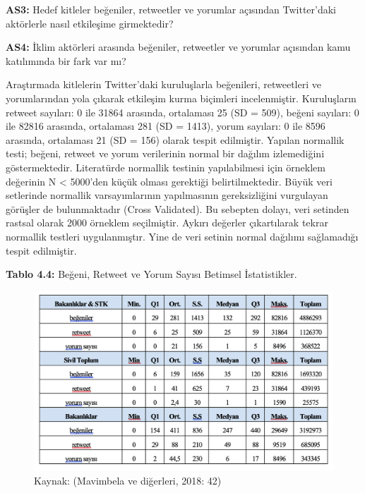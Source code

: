 \documentclass[
]{book}
\begin{document}
\textbf{AS3:} Hedef kitleler beğeniler, retweetler ve yorumlar açısından Twitter'daki aktörlerle nasıl etkileşime girmektedir?

\textbf{AS4:} İklim aktörleri arasında beğeniler, retweetler ve yorumlar açısından kamu katılımında bir fark var mı?

Araştırmada kitlelerin Twitter'daki kuruluşlarla beğenileri, retweetleri ve yorumlarından yola çıkarak etkileşim kurma biçimleri incelenmiştir. Kuruluşların retweet sayıları: 0 ile 31864 arasında, ortalaması 25 (SD = 509), beğeni sayıları: 0 ile 82816 arasında, ortalaması 281 (SD = 1413), yorum sayıları: 0 ile 8596 arasında, ortalaması 21 (SD = 156) olarak tespit edilmiştir. Yapılan normallik testi; beğeni, retweet ve yorum verilerinin normal bir dağılım izlemediğini göstermektedir. Literatürde normallik testinin yapılabilmesi için örneklem değerinin N \textless{} 5000'den küçük olması gerektiği belirtilmektedir. Büyük veri setlerinde normallik varsayımlarının yapılmasının gereksizliğini vurgulayan görüşler de bulunmaktadır (Cross Validated). Bu sebepten dolayı, veri setinden rastsal olarak 2000 örneklem seçilmiştir. Aykırı değerler çıkartılarak tekrar normallik testleri uygulanmıştır. Yine de veri setinin normal dağılımı sağlamadığı tespit edilmiştir.

\textbf{Tablo 4.4:} Beğeni, Retweet ve Yorum Sayısı Betimsel İstatistikler.

\begin{figure}
\includegraphics[width=0.95\linewidth,height=0.95\textheight]{tablolar-sekiller/tablo-4-4} \caption{Kaynak: (Mavimbela ve diğerleri, 2018: 42)}\label{fig:unnamed-chunk-8}
\end{figure}
\end{document}
